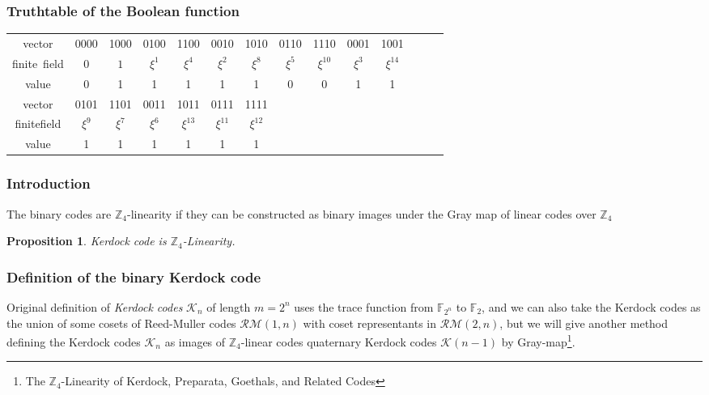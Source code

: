 \documentclass[
    aspectratio=169,                   %
]{beamer}
\renewcommand{\Bbb}{\mathbb}
\newcommand{\Z}{\mathbb{Z}}
\newtheorem{proposition}{Proposition}
\begin{document}
    \begin{frame}
        \frametitle{Truthtable of the Boolean function}
    
        \begin{center}
    
            \begin{tabularx}{\textwidth}{|c|c|c|c|c|c|c|c|c|c|c|c|c|c|}
                \toprule
                vector&0000&1000&0100 &1100 &0010 &1010 &0110 &1110    &0001 &1001\\
                finite~field&$0$   &   $1$&$\xi^1$&$\xi^4$&$\xi^2$&$\xi^8$&$\xi^5$&$\xi^{10}$&$\xi^3$&$\xi^{14}$\\
                value&0   &   1&1    &1    &1    &1    &0    &0       &1    &1\\
                \midrule
                vector      &0101&1101&0011&1011&0111&1111&&&&\\
                finitefield &$\xi^9$&$\xi^7$&$\xi^6$&$\xi^{13}$&$\xi^{11}$&$\xi^{12}$&&&&\\
                value       &1&1&1&1&1&1&&&&\\
                \bottomrule
            \end{tabularx}
        \end{center}
    
    \end{frame}
    \begin{frame}
        \frametitle{Introduction}
    
        \begin{definition}[$ \Z_4 $-linearity]
            The binary codes are $ \Z_4 $-linearity if they can be constructed as binary images under the Gray map of linear codes over $ \Z_4 $
        \end{definition}
        
        \begin{proposition}
            Kerdock code is $\Bbb Z_4$-Linearity.
        \end{proposition}
    
    \end{frame}
    \begin{frame}
        \frametitle{Definition of the binary Kerdock code}
    
        Original definition of \textit{Kerdock codes} $\mathcal{K}_n$ of length $m=2^n$ uses the trace function from $\Bbb F_{2^n}$ to $\Bbb F_2$, and we can also take the Kerdock codes as the union of some cosets of Reed-Muller codes $\mathcal{RM}(1,n)$ with coset representants in $\mathcal{RM}(2,n)$, but we will give another method defining the Kerdock codes $ \mathcal{K}_n $ as images of $\Bbb Z_4$-linear codes quaternary Kerdock codes $ \mathcal{K}(n-1) $ by Gray-map\footnote{The $\Bbb Z_4$-Linearity of Kerdock, Preparata, Goethals, and Related Codes}.
    
    \end{frame}
\end{document}
